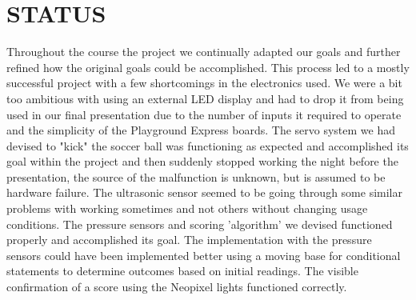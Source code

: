 \documentclass[12pt]{article}
\begin{document}











\section{STATUS}
Throughout the course the project we continually adapted our goals and further refined how the original goals
could be accomplished. This process led to a mostly successful project with a few shortcomings in the 
electronics used. We were a bit too ambitious with using an external LED display and had to drop it from being used in our final presentation due to the number of inputs it required to operate and the simplicity of the Playground Express boards. The servo system we had devised to "kick" the soccer ball was functioning as expected and accomplished its goal within the project and then suddenly stopped working the night before the presentation, the source of the malfunction is unknown, but is assumed to be hardware failure. The ultrasonic sensor seemed to be going through some similar problems with working sometimes and not others without changing usage conditions. The pressure sensors and scoring 'algorithm' we devised functioned properly and accomplished its goal. The implementation with the pressure sensors could have been implemented better using a moving base for conditional statements to determine outcomes based on initial readings. The visible confirmation of a score using the Neopixel lights functioned correctly.
\end{document}
